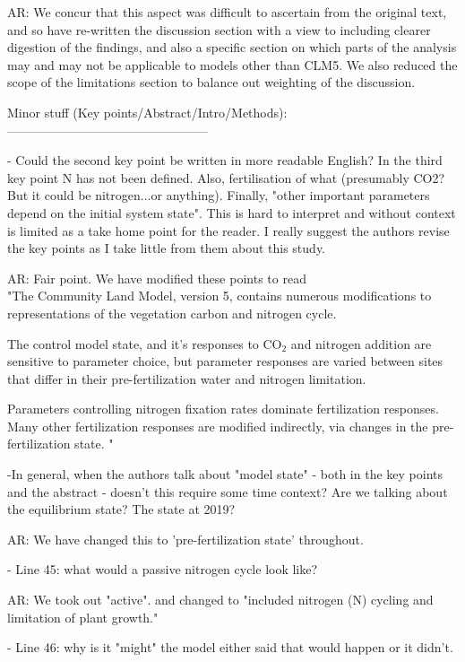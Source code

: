 \documentclass{article}
\begin{document}
\textsf{AR: We concur that this aspect was difficult to ascertain from the original text, and so have re-written the discussion section with a view to including clearer digestion of the findings, and also a specific section on which parts of the analysis may and may not be applicable to models other than CLM5. We also reduced the scope of the limitations section to balance out weighting of the discussion.}

Minor stuff (Key points/Abstract/Intro/Methods): 
------------------------------------------------ 

- Could the second key point be written in more readable English? In the third key point N has not been defined. Also, fertilisation of what (presumably CO2? But it could be nitrogen...or anything). Finally, "other important parameters depend on the initial system state". This is hard to interpret and without context is limited as a take home point for the reader. I really suggest the authors revise the key points as I take little from them about this study. 

\textsf{AR: Fair point. We have modified these points to read\\
"The Community Land Model, version 5, contains numerous modifications to representations of the vegetation carbon and nitrogen cycle.}

\textsf{The control model state, and it's responses to CO$_{2}$ and nitrogen addition are sensitive to parameter choice, but parameter responses are varied between sites that differ in their pre-fertilization water and nitrogen limitation. }

\textsf{Parameters controlling nitrogen fixation rates dominate fertilization responses. Many other fertilization responses are modified indirectly, via changes in the pre-fertilization state. "}

-In general, when the authors talk about "model state" - both in the key points and the abstract - doesn't this require some time context? Are we talking about the equilibrium state? The state at 2019? 

\textsf{AR: We have changed this to 'pre-fertilization state' throughout. }

- Line 45: what would a passive nitrogen cycle look like? 

\textsf{AR:  We took out "active". and changed to "included nitrogen (N) cycling and limitation of plant growth."}

- Line 46: why is it "might" the model either said that would happen or it didn't. 
\end{document}
